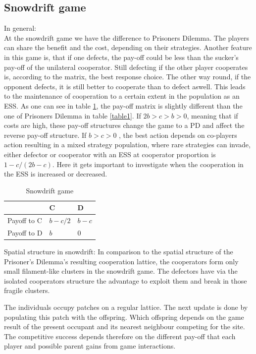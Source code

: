 \documentclass[DIV=calc, paper=a4, fontsize=11pt, twocolumn]{scrartcl}	 %
\begin{document}
\subsection*{Snowdrift game}

In general: \\
At the snowdrift game we have the difference to Prisoners Dilemma. The players can share the benefit and the cost, depending on their strategies. Another feature in this game is, that if one defects, the pay-off could be less than the sucker's pay-off of the unilateral cooperator. Still defecting if the other player cooperates is, according to the matrix, the best response choice. The other way round, if the opponent defects, it is still better to cooperate than to defect aswell. This leads to the maintenance of cooperation to a certain extent in the population as an ESS. As one can see in table \ref{table2}, the pay-off matrix is slightly different than the one of Prisoners Dilemma in table \ref{table1}. 
If $2b > c > b > 0$, meaning that if costs are high, these pay-off structures change the game to a PD and affect the reverse pay-off structure. If $b > c > 0$ , the best action depends on co-players action resulting in a mixed strategy population, where rare strategies can invade, either defector or cooperator with an ESS at cooperator proportion is $1- c/(2b-c)$. Here it gets important to investigate when the cooperation in the ESS is increased or decreased.


\begin{table}[h]
\caption{Snowdrift game}
\label{table2}
\centering
\begin{tabular}{lll}
 & C & D \\
\midrule
Payoff to C & $b-c/2$ & $b-c$ \\
Payoff to D & $b$ & $0$ \\
\bottomrule
\end{tabular}
\end{table}

Spatial structure in snowdrift: 
In comparison to the spatial structure  of the Prisoner's Dilemma's resulting cooperation lattice, the cooperators form only small filament-like clusters in the snowdrift game. The defectors have via the isolated cooperators structure the advantage to exploit them and break in those fragile clusters. 

The individuals occupy patches on a regular lattice. The next update is done by populating this patch with the offspring. Which offspring depends on the game result of the present occupant and its nearest neighbour competing for the site. The competitive success depends therefore on the different pay-off that each player and possible parent gains from game interactions. 
\end{document}
